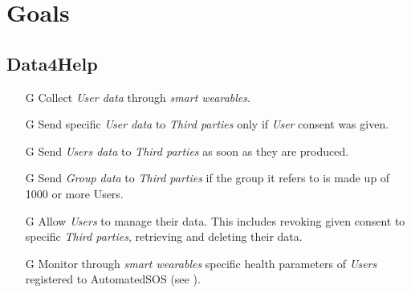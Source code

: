 \documentclass[../../rasd.tex]{subfiles}
\begin{document}
\section{Goals}
				\subsection{Data4Help}
					\begin{itemize}
						
						\item[G\subs{1}]Collect \textit{User data} through \textit{smart wearables}.
						\item[G\subs{2}]Send specific \textit{User data} to \textit{Third parties} only if \textit{User} consent was given.
						\item[G\subs{3}]Send \textit{Users data} to \textit{Third parties} as soon as they are produced.
						\item[G\subs{4}]Send \textit{Group data} to \textit{Third parties} if the group it refers to is made up of 1000 or more Users.
						\item[G\subs{5}]Allow \textit{Users} to manage their data. This includes revoking given consent to specific \textit{Third parties}, retrieving and deleting their data.
						\item[G\subs{6}]Monitor through \textit{smart wearables} specific health parameters of \textit{Users} registered to AutomatedSOS (see ).

						
													
						
						

						
					\end{itemize}
\end{document}
